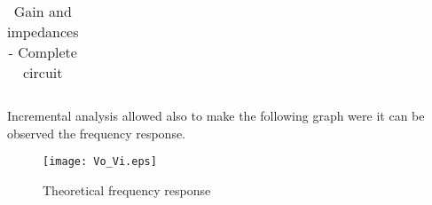 \begin{table}[H]
  \centering
  \begin{tabular}{|c|c|}
    \hline
        
        \hline
  \end{tabular}
  \caption{Gain and impedances - Complete circuit}
  \label{gaintotal}
\end{table}

Incremental analysis allowed also to make the following graph were it can be observed the frequency response. 

\begin{figure}[H]
  \centering
  \texttt{[image: Vo\_Vi.eps]}
  \caption{Theoretical frequency response}
  \label{fig:frequencyresp}
\end{figure}
